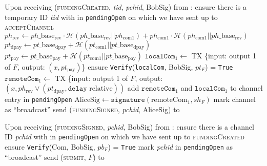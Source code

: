 \begin{algorithmic}[1]
    \State Upon receiving (\textsc{fundingCreated}, \textit{tid},
    \textit{pchid}, BobSig) from \bob:
    \Indent
      \State ensure there is a temporary ID \textit{tid} with \bob{} in
      \texttt{pendingOpen} on which we have sent up to \textsc{acceptChannel}
      \State $ph_{\mathrm{rev}} \gets ph\_\mathrm{base}_{\mathrm{rev}} \cdot
      \mathcal{H}\left(ph\_\mathrm{base}_{\mathrm{rev}} ||
      ph_{\mathrm{com}1}\right) + ph_{\mathrm{com}1} \cdot \mathcal{H}\left(
      ph_{\mathrm{com}1} || ph\_\mathrm{base}_{\mathrm{rev}}\right)$
      \State $pt_{\mathrm{dpay}} \gets pt\_\mathrm{base}_{\mathrm{dpay}} +
      \mathcal{H}\left(pt_{\mathrm{com}1} ||
      pt\_\mathrm{base}_{\mathrm{dpay}}\right)$
      \State $pt_{\mathrm{pay}} \gets pt\_\mathrm{base}_{\mathrm{pay}} +
      \mathcal{H}\left(pt_{\mathrm{com}1} ||
      pt\_\mathrm{base}_{\mathrm{pay}}\right)$
      \State $\mathtt{localCom}_1 \gets$ TX \{input: output 1 of $F$, output:
      $\left(x, pt_{\mathrm{pay}}\right)$\}
      \State ensure \texttt{Verify}(\texttt{localCom}, BobSig, $pt_F$) =
      \texttt{True}
      \State $\mathtt{remoteCom}_1 \gets$ TX \{input: output 1 of $F$, output:
      $\left(x, ph_{\mathrm{rev}} \vee \left(pt_{\mathrm{dpay}}, \mathtt{delay}
      \text{ relative}\right)\right)$ 
      \State add $\mathtt{remoteCom}_1$ and $\mathtt{localCom}_1$ to channel
      entry in \texttt{pendingOpen}
      \State $\mathrm{AliceSig} \gets
      \mathtt{signature}\left(\mathrm{remoteCom}_1, sh_F\right)$
      \State mark channel as ``broadcast''
      \State send (\textsc{fundingSigned}, \textit{pchid}, AliceSig) to \bob
    \EndIndent
    \State

    \State Upon receiving (\textsc{fundingSigned}, \textit{pchid}, BobSig) from
    \bob:
    \Indent
      \State ensure there is a channel ID \textit{pchid} with \bob{} in
      \texttt{pendingOpen} on which we have sent up to \textsc{fundingCreated}
      \State ensure \texttt{Verify}(Com, BobSig, $pb_F$) = \texttt{True}
      \State mark \textit{pchid} in \texttt{pendingOpen} as ``broadcast''
      \State send (\textsc{submit}, $F$) to \ledger
    \EndIndent
    \State


\end{algorithmic}

